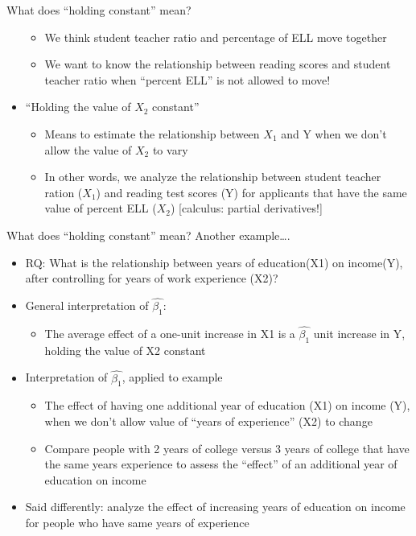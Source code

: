 \documentclass[
  8pt,
  ignorenonframetext,
  dvipsnames]{beamer}
\providecommand{\tightlist}{%
  \setlength{\itemsep}{0pt}\setlength{\parskip}{0pt}}
\let\olditem\item
\renewcommand{\item}{%
  \olditem\vspace{4pt}
}
\begin{document}
\begin{frame}{What does ``holding constant'' mean?}
\begin{itemize}
  \begin{itemize}
  \tightlist
  \item
    We think student teacher ratio and percentage of ELL move together
  \item
    We want to know the relationship between reading scores and student
    teacher ratio when ``percent ELL'' is not allowed to move!
  \end{itemize}
\item
  ``Holding the value of \(X_2\) constant''

  \begin{itemize}
  \tightlist
  \item
    Means to estimate the relationship between \(X_1\) and Y when we
    don't allow the value of \(X_2\) to vary
  \item
    In other words, we analyze the relationship between student teacher
    ration (\(X_1\)) and reading test scores (Y) for applicants that
    have the same value of percent ELL (\(X_2\)) {[}calculus: partial
    derivatives!{]}
  \end{itemize}
\end{itemize}

\end{frame}

\begin{frame}{What does ``holding constant'' mean? Another
example\ldots.}
\protect\hypertarget{what-does-holding-constant-mean-another-example.}{}

\begin{itemize}
\tightlist
\item
  RQ: What is the relationship between years of education(X1) on
  income(Y), after controlling for years of work experience (X2)?
\item
  General interpretation of \(\hat{\beta_1}\):

  \begin{itemize}
  \tightlist
  \item
    The average effect of a one-unit increase in X1 is a
    \(\hat{\beta_1}\) unit increase in Y, holding the value of X2
    constant
  \end{itemize}
\item
  Interpretation of \(\hat{\beta_1}\), applied to example

  \begin{itemize}
  \tightlist
  \item
    The effect of having one additional year of education (X1) on income
    (Y), when we don't allow value of ``years of experience'' (X2) to
    change
  \item
    Compare people with 2 years of college versus 3 years of college
    that have the same years experience to assess the ``effect'' of an
    additional year of education on income
  \end{itemize}
\item
  Said differently: analyze the effect of increasing years of education
  on income for people who have same years of experience
\end{itemize}

\end{frame}
\end{document}
